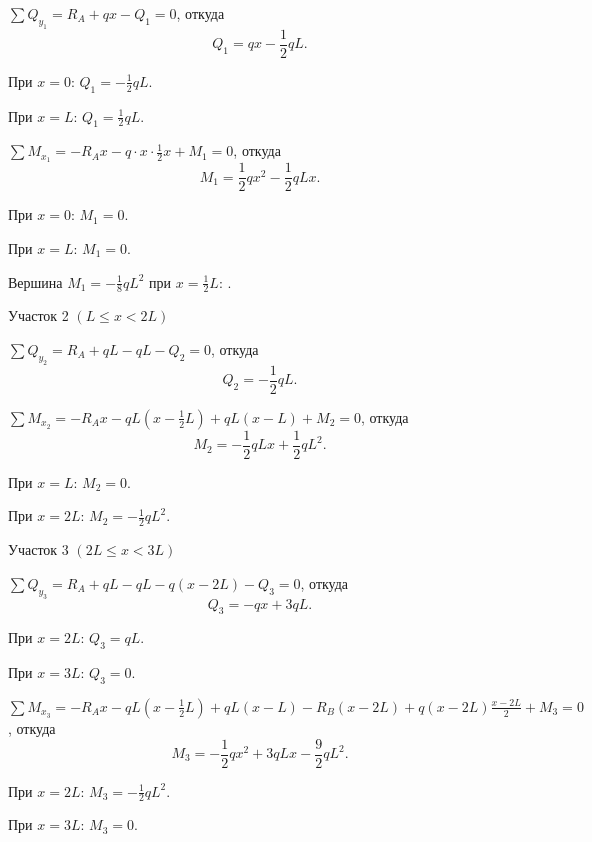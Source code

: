 $\sum Q_{y_1} = R_A + qx - Q_1 = 0$,
откуда
\[
    Q_1 = qx - \frac{1}{2} qL.
\]

При $x = 0$: $Q_1 = -\frac{1}{2}qL$.

При $x = L$: $Q_1 = \frac{1}{2}qL$.

$\sum M_{x_1} = -R_A x - q \cdot x \cdot \frac{1}{2} x + M_1 = 0$,
откуда
\[
    M_1 = \frac{1}{2} qx^2 - \frac{1}{2} qL x.
\]

При $x = 0$: $M_1 = 0$.

При $x = L$: $M_1 = 0$.

Вершина $M_1 = -\frac{1}{8}qL^2$ при $x = \frac{1}{2} L$: .

\vspace{1.5ex}

Участок 2 $\left(L \le x < 2L\right)$

$\sum Q_{y_2} = R_A + qL - qL - Q_2 = 0$,
откуда
\[
    Q_2 = -\frac{1}{2} qL.
\]

$\sum M_{x_2} = -R_A x - q L (x - \frac{1}{2} L) + qL (x - L) + M_2 = 0$,
откуда
\[
    M_2 = -\frac{1}{2} qLx + \frac{1}{2} qL^2.
\]

При $x = L$: $M_2 = 0$.

При $x = 2L$: $M_2 = -\frac{1}{2}qL^2$.

\vspace{1.5ex}

Участок 3 $\left(2L \le x < 3L\right)$

$\sum Q_{y_3} = R_A + qL - qL - q(x - 2L) - Q_3 = 0$,
откуда
\[
    Q_3 = -qx + 3qL.
\]

При $x = 2L$: $Q_3 = qL$.

При $x = 3L$: $Q_3 = 0$.

$\sum M_{x_3} = -R_A x - q L (x - \frac{1}{2} L) + qL (x - L) - R_B (x - 2L) + q (x - 2L) \frac{x-2L}{2} + M_3 = 0$,
откуда 
\[
    M_3 = -\frac{1}{2} qx^2 + 3qLx - \frac{9}{2} qL^2.
\]

При $x = 2L$: $M_3 = -\frac{1}{2}qL^2$.

При $x = 3L$: $M_3 = 0$.

